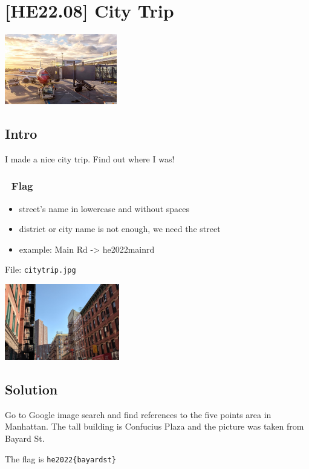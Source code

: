 
\hypertarget{he22.08}{%
\chapter{[HE22.08] City Trip}\label{he22.08}}

\begin{marginfigure}
	\includegraphics[width=49mm]{level3/challenge8.jpg}
\end{marginfigure}
\section{Intro}
I made a nice city trip. Find out where I was!

\subsection{{\NotoEmoji 🚩} Flag}
\begin{itemize}
\item    street's name in lowercase and without spaces
\item    district or city name is not enough, we need the street
\item    example: Main Rd -> he2022{mainrd}
\end{itemize}

File: \verb+citytrip.jpg+
\begin{marginfigure}
\includegraphics[width=50mm]{level3/citytrip.jpg}
\end{marginfigure}
\section{Solution}\label{hv21.08-solution}

Go to Google image search and find references to the five points area in Manhattan.  The tall building is Confucius Plaza and the picture was taken from Bayard St.

The flag is \verb+he2022{bayardst}+

